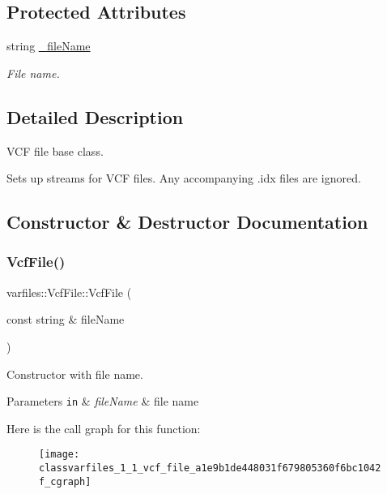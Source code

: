 \subsection*{Protected Attributes}
\begin{DoxyCompactItemize}
\item 
\mbox{\label{classvarfiles_1_1_vcf_file_abd693793f8da2f13d8298d8139785d13}} 
string \hyperlink{classvarfiles_1_1_vcf_file_abd693793f8da2f13d8298d8139785d13}{\+\_\+file\+Name}
\begin{DoxyCompactList}\small\item\em File name. \end{DoxyCompactList}\end{DoxyCompactItemize}


\subsection{Detailed Description}
V\+CF file base class. 

Sets up streams for V\+CF files. Any accompanying .idx files are ignored. 

\subsection{Constructor \& Destructor Documentation}
\mbox{\label{classvarfiles_1_1_vcf_file_a1e9b1de448031f679805360f6bc1042f}} 
\subsubsection{\texorpdfstring{Vcf\+File()}{VcfFile()}}
{\footnotesize\ttfamily varfiles\+::\+Vcf\+File\+::\+Vcf\+File (\begin{DoxyParamCaption}\item[{const string \&}]{file\+Name }\end{DoxyParamCaption})\hspace{0.3cm}{\ttfamily [inline]}}



Constructor with file name. 


\begin{DoxyParams}[1]{Parameters}
\mbox{\tt in}  & {\em file\+Name} & file name \\
\hline
\end{DoxyParams}
Here is the call graph for this function\+:\nopagebreak
\begin{figure}[H]
\begin{center}
\leavevmode
\texttt{[image: classvarfiles\_1\_1\_vcf\_file\_a1e9b1de448031f679805360f6bc1042f\_cgraph]}
\end{center}
\end{figure}


